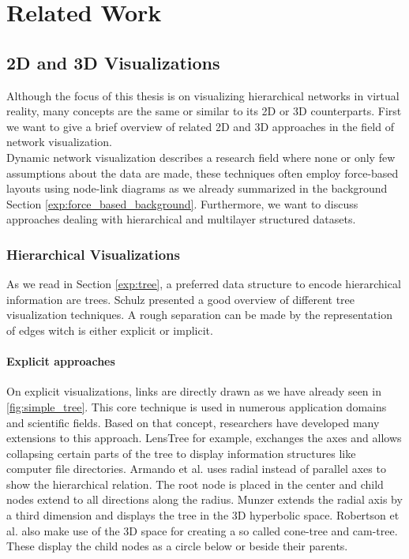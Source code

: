 \chapter{Related Work}

\section{2D and 3D Visualizations}
\label{chap:rw-2d3dLayout}
Although the focus of this thesis is on visualizing hierarchical networks in virtual reality, many concepts are the same or similar to its 2D or 3D counterparts. First we want to give a brief overview of related 2D and 3D approaches in the field of network visualization.\\
Dynamic network visualization describes a research field where none or only few assumptions about the data are made, these techniques often employ force-based layouts using node-link diagrams as we already summarized in the background Section \ref{exp:force_based_background}. Furthermore, we want to discuss approaches dealing with hierarchical and multilayer structured datasets.

\subsection{Hierarchical Visualizations}

As we read in Section \ref{exp:tree}, a preferred data structure to encode hierarchical information are trees.
Schulz \cite{schulz_treevisnet_2011} presented a good overview of different tree visualization techniques. A rough separation can be made by the representation of edges witch is either explicit or implicit. 

\subsubsection{Explicit approaches}
On explicit visualizations, links are directly drawn as we have already seen in \ref{fig:simple_tree}. This core technique is used in numerous application domains and scientific fields. Based on that concept, researchers have developed many extensions to this approach.
LensTree \cite{song_lenstree_2006} for example, exchanges the axes and allows collapsing certain parts of the tree to display information structures like computer file directories. 
Armando et al. \cite{arce-orozco_radial_2017} uses radial instead of parallel axes to show the hierarchical relation. The root node is placed in the center and child nodes extend to all directions along the radius.
Munzer \cite{munzner_h3_1997} extends the radial axis by a third dimension and displays the tree in the 3D hyperbolic space.
Robertson et al. \cite{robertson_cone_1991} also make use of the 3D space for creating a so called cone-tree and cam-tree. These display the child nodes as a circle below or beside their parents.  


